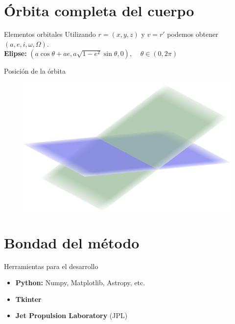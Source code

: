 \documentclass{beamer}
\begin{document}
\section{Órbita completa del cuerpo}
\begin{frame}{Elementos orbitales}
Utilizando $r=(x,y,z)$ y $v=r'$ podemos obtener $(a,e,i,\omega,\Omega)$.\\
\pause
\vspace{1cm}
\textbf{Elipse:}
\hspace{0.75cm}
$
(a\cos{\theta}+ae, a\sqrt{1-e^2}\sin{\theta}, 0), \; \; \; \; \theta\in(0,2\pi)
$
\end{frame}


\begin{frame}{Posición de la órbita}
\begin{figure}[H]
\centering
\includegraphics[scale=0.41]{images/inclinacion.png}
\end{figure}
\end{frame}

\section{Bondad del método}

\begin{frame}{Herramientas para el desarrollo}
\begin{itemize}
\item \textbf{Python:} Numpy, Matplotlib, Astropy, etc.
\item \textbf{Tkinter}
\item \textbf{Jet Propulsion Laboratory} (JPL)
\end{itemize}
\end{frame}
\end{document}
